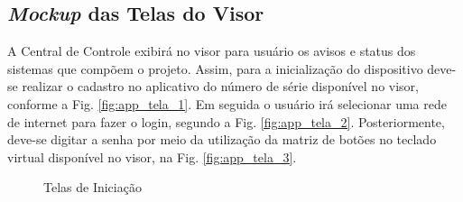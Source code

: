 \begin{apendicesenv}

\chapter{\textit{Mockup} das Telas do Visor}\label{app_telas_display}

A Central de Controle exibirá no visor para usuário os avisos e status dos sistemas que compõem o projeto. Assim, para a inicialização do dispositivo deve-se realizar o cadastro no aplicativo do número de série disponível no visor, conforme a Fig. \ref{fig:app_tela_1}. Em seguida o usuário irá selecionar uma rede de internet para fazer o login, segundo a Fig. \ref{fig:app_tela_2}. Posteriormente, deve-se digitar a senha por meio da utilização da matriz de botões no teclado virtual disponível no visor, na Fig. \ref{fig:app_tela_3}. 

\begin{figure}[H]
    \centering
    \caption{Telas de Iniciação}\label{fig:telas_1_2_3}
\end{figure}


\end{apendicesenv}

